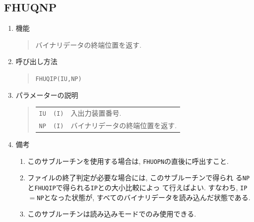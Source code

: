 \subsection{FHUQNP}
\begin{enumerate}
  \item 機能 
  \begin{quote}
   バイナリデータの終端位置を返す.
  \end{quote}
  \item 呼び出し方法 
  \begin{quote}
   {\tt FHUQIP(IU,NP)}
  \end{quote}
  \item パラメーターの説明 
  \begin{quote}
    \begin{tabular}{llp{10cm}}
      {\tt IU}   & {\tt (I)} & 入出力装置番号. \\
      {\tt NP}   & {\tt (I)} & バイナリデータの終端位置を返す.
    \end{tabular}
  \end{quote}
  \item 備考 
  \begin{enumerate}
    \item このサブルーチンを使用する場合は, {\tt FHUOPN}の直後に呼出すこと.
    \item ファイルの終了判定が必要な場合には, このサブルーチンで得られ
          る{\tt NP}と{\tt FHUQIP}で得られる{\tt IP}との大小比較によっ
          て行えばよい. すなわち, {\tt IP}$=${\tt NP}となった状態が, 
          すべてのバイナリデータを読み込んだ状態である.
    \item このサブルーチンは読み込みモードでのみ使用できる. 
  \end{enumerate}
\end{enumerate}

